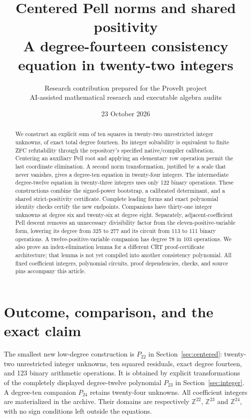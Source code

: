 \documentclass[11pt]{article}
\title{Centered Pell norms and shared positivity\\\large A degree-fourteen consistency equation in twenty-two integers}
\author{Research contribution prepared for the ProveIt project\\\small AI-assisted mathematical research and executable algebra audits}
\date{23 October 2026}
\theoremstyle{remark}\newtheorem{remark}[theorem]{Remark}
\newcommand{\Z}{\mathbb Z}\newcommand{\N}{\mathbb N}\newcommand{\Q}{\mathbb Q}
\begin{document}
\maketitle
\begin{abstract}
We construct an explicit sum of ten squares in twenty-two unrestricted
integer unknowns, of exact total degree fourteen. Its integer solvability is
equivalent to finite ZFC refutability through the repository's specified
native/compiler calibration. Centering an auxiliary Pell root and applying
an elementary row operation permit the last coordinate elimination.
A second norm transformation, justified by a scale that never vanishes,
gives a degree-ten equation in twenty-four integers. The intermediate
degree-twelve equation in twenty-three integers uses only 122 binary
operations. These constructions combine the signed-power bootstrap,
a calibrated determinant, and a shared strict-positivity certificate.
Complete leading forms and exact polynomial identity checks certify the
new endpoints. Companions have thirty-one integer unknowns at degree six
and twenty-six at degree eight. Separately, adjacent-coefficient Pell descent removes an
unnecessary divisibility factor from the eleven-positive-variable form,
lowering its degree from 325 to 277 and its circuit from 113 to 111 binary
operations. A twelve-positive-variable companion has degree 78 in 103
operations. We also prove an index-elimination lemma for a different CRT
proof-certificate architecture; that lemma is not yet compiled into another
consistency polynomial. All fixed coefficient integers, polynomial circuits,
proof dependencies, checks, and source pins accompany this article.
\end{abstract}
\tableofcontents
\newpage

\section{Outcome, comparison, and the exact claim}

The smallest new low-degree construction is $P_{22}$ in
Section~\ref{sec:centered}: twenty-two unrestricted integer unknowns,
ten squared residuals, exact degree fourteen, and 123 binary arithmetic
operations. It is obtained by explicit transformations of the completely
displayed degree-twelve polynomial $P_{23}$ in Section~\ref{sec:integer}.
A degree-ten companion $P_{24}$ retains twenty-four unknowns. All
coefficient integers are materialized in the archive. Their domains are
respectively $\Z^{22}$, $\Z^{23}$ and $\Z^{24}$, with no sign conditions
left outside the equations.
\end{document}
